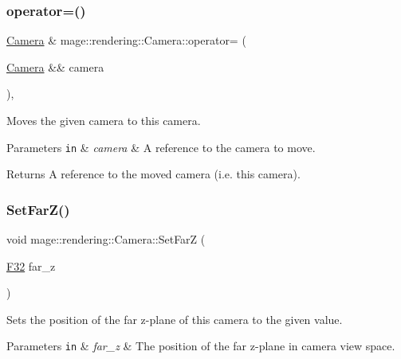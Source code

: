 \subsubsection{\texorpdfstring{operator=()}{operator=()}\hspace{0.1cm}{\footnotesize\ttfamily [2/2]}}
{\footnotesize\ttfamily \hyperlink{classmage_1_1rendering_1_1_camera}{Camera} \& mage\+::rendering\+::\+Camera\+::operator= (\begin{DoxyParamCaption}\item[{\hyperlink{classmage_1_1rendering_1_1_camera}{Camera} \&\&}]{camera }\end{DoxyParamCaption})\hspace{0.3cm}{\ttfamily [default]}, {\ttfamily [noexcept]}}

Moves the given camera to this camera.


\begin{DoxyParams}[1]{Parameters}
\mbox{\tt in}  & {\em camera} & A reference to the camera to move. \\
\hline
\end{DoxyParams}
\begin{DoxyReturn}{Returns}
A reference to the moved camera (i.\+e. this camera). 
\end{DoxyReturn}
\hypertarget{classmage_1_1rendering_1_1_camera_a1c0924d95ff4a1da571be49e05f31da2}{}\label{classmage_1_1rendering_1_1_camera_a1c0924d95ff4a1da571be49e05f31da2} 
\subsubsection{\texorpdfstring{Set\+Far\+Z()}{SetFarZ()}}
{\footnotesize\ttfamily void mage\+::rendering\+::\+Camera\+::\+Set\+FarZ (\begin{DoxyParamCaption}\item[{\hyperlink{namespacemage_aa97e833b45f06d60a0a9c4fc22ae02c0}{F32}}]{far\+\_\+z }\end{DoxyParamCaption})\hspace{0.3cm}{\ttfamily [noexcept]}}

Sets the position of the far z-\/plane of this camera to the given value.


\begin{DoxyParams}[1]{Parameters}
\mbox{\tt in}  & {\em far\+\_\+z} & The position of the far z-\/plane in camera view space. \\
\hline
\end{DoxyParams}
\hypertarget{classmage_1_1rendering_1_1_camera_a3301bdfa8d5408c79d5720193d91f8c6}{}\label{classmage_1_1rendering_1_1_camera_a3301bdfa8d5408c79d5720193d91f8c6} 
